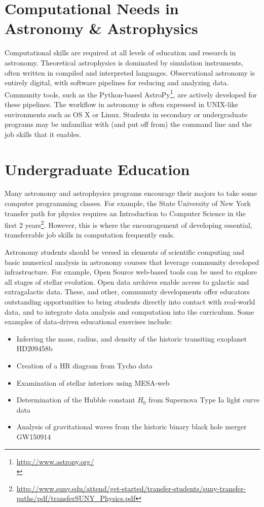 \documentclass[11pt]{article}
\newenvironment{squishlist}                                                     
  {\begin{itemize}                                                              
    \addtolength{\itemsep}{-0.33\baselineskip}                                  
   }                                                                            
  { \end{itemize} }
\begin{document}
\section{Computational Needs in Astronomy \& Astrophysics}

Computational skills are required at all levels of education
and research in astronomy.  Theoretical astrophysics is dominated by simulation instruments, 
often written in compiled and interpreted languages. 
Observational astronomy is entirely digital, with 
software pipelines for reducing and analyzing data.  Community tools, such as the Python-based
AstroPy\footnote{\url{http://www.astropy.org/}\\}, are actively developed for these pipelines.
The workflow in astronomy is often expressed in UNIX-like environments such as  OS X or Linux.
Students in secondary or undergraduate programs may be unfamiliar with
(and put off from) the command line and the job skills that it enables.

\section{Undergraduate Education}

Many astronomy and astrophysics programs encourage their majors to
take some computer programming classes.  For example, the State
University of New York transfer path for physics requires an Introduction to Computer Science 
in the first 2
years\footnote{\url{http://www.suny.edu/attend/get-started/transfer-students/suny-transfer-paths/pdf/transferSUNY_Physics.pdf}\hfill}.
However, this is where the encouragement of developing essential,
transferrable job skills in computation frequently ends. 

Astronomy students should be versed in elements of scientific computing and
basic numerical analysis in astronomy courses that leverage
community developed infrastructure. For example, Open Source web-based tools can 
be used to explore all stages of stellar evolution. Open data archives enable access to
galactic and extragalactic data.  These, and other, communuty
developments offer educators outstanding opportunities to bring
students directly into contact with real-world data, and to integrate
data analysis and computation into the curriculum. Some examples of
data-driven educational exercises include:
\begin {squishlist}
\item Inferring the mass, radius, and density of the historic transiting exoplanet HD209458b
\item Creation of a HR diagram from Tycho data
\item Examination of stellar interiors using MESA-web
\item Determination of the Hubble constant $H_0$ from Supernova Type Ia light curve data
\item Analysis of gravitational waves from the historic binary black hole merger GW150914
\end {squishlist}
\end{document}
